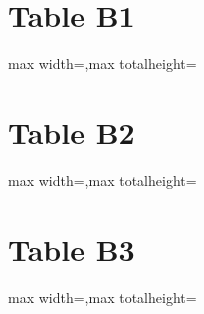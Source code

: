 \documentclass[10pt]{article}
\begin{document}
\section*{Table B1}
\begin{adjustbox}{max width=\textwidth,max totalheight=\dimexpr\textheight-3cm\relax}\end{adjustbox}
\clearpage
\section*{Table B2}
\begin{adjustbox}{max width=\textwidth,max totalheight=\dimexpr\textheight-3cm\relax}\end{adjustbox}
\clearpage
\section*{Table B3}
\begin{adjustbox}{max width=\textwidth,max totalheight=\dimexpr\textheight-3cm\relax}\end{adjustbox}
\end{document}
